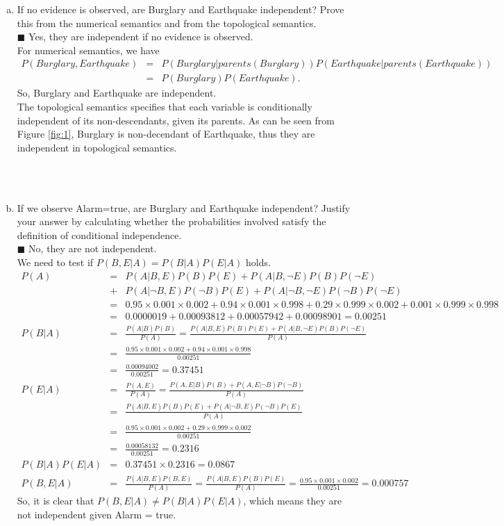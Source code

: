 \documentclass{article}
\newcommand{\solution}[1]{~\\ $\blacksquare$ \sffamily\upshape\selectfont #1
\normalfont ~\\~ }
\begin{document}
\begin{enumerate}[a.]
\item If no evidence is observed, are Burglary and Earthquake
  independent? Prove this from the numerical semantics and from the
  topological semantics.
  \solution{Yes, they are independent if no evidence is observed. \\ 
    For numerical semantics, we have 
    \begin{eqnarray*}
      P(Burglary, Earthquake) & = &
      P(Burglary|parents(Burglary))P(Earthquake|parents(Earthquake))  \\
  & = & P(Burglary)P(Earthquake). 
\end{eqnarray*}
So, Burglary and Earthquake are independent. \\
The topological semantics specifies that each variable is
conditionally independent of its non-descendants, given its
parents. As can be seen from Figure \ref{fig:1}, Burglary is
non-decendant of Earthquake, thus they are independent in
topological semantics. 
}
\item If we observe Alarm=true, are Burglary and Earthquake
independent? Justify your answer by calculating whether the
probabilities involved satisfy the definition of conditional
independence.
\solution{No, they are not independent. \\
We need to test if $P(B,E|A) = P(B|A)P(E|A)$ holds. 
\begin{eqnarray*}
P(A) & = & P(A|B,E)P(B)P(E) + P(A|B,\neg E)P(B)P(\neg E) \\ 
& + & P(A|\neg B,E)P(\neg B)P(E) + P(A|\neg B,\neg E)P(\neg B)P(\neg E) \\ 
& = & 0.95\times 0.001\times 0.002 + 0.94\times 0.001\times 0.998 +
0.29\times 0.999\times 0.002 + 0.001\times 0.999 \times 0.998 \\ 
& = & 0.0000019 + 0.00093812 + 0.00057942 + 0.00098901 = 0.00251 \\
P(B|A) & = & \frac{P(A|B)P(B)}{P(A)} 
= \frac{P(A|B,E)P(B)P(E)+P(A|B,\neg E)P(B)P(\neg E)}{P(A)} \\
& = & \frac{0.95\times 0.001\times 0.002 + 0.94\times 0.001\times
  0.998}{0.00251}\\ 
& = & \frac{0.00094002}{0.00251} = 0.37451 \\
P(E|A) & = & \frac{P(A,E)}{P(A)}
 = \frac{P(A,E|B)P(B)+P(A,E|\neg B)P(\neg B)}{P(A)} \\
& = & \frac{P(A|B,E)P(B)P(E)+P(A|\neg B,E)P(\neg B)P(E)}{P(A)} \\
& = & \frac{0.95\times 0.001\times 0.002 + 0.29\times 0.999\times
  0.002}{0.00251} \\ 
& = & \frac{0.00058132}{0.00251} = 0.2316 \\
P(B|A)P(E|A) & = & 0.37451 \times 0.2316 = 0.0867 \\
P(B,E|A) & = & \frac{P(A|B,E)P(B,E)}{P(A)}
 = \frac{P(A|B,E)P(B)P(E)}{P(A)} = \frac{0.95\times 0.001\times 0.002}{0.00251} = 0.000757 
\end{eqnarray*}
So, it is clear that $P(B,E|A)\neq P(B|A)P(E|A)$, which means they are
not independent given Alarm = true. 
}
\end{enumerate}
\end{document}
